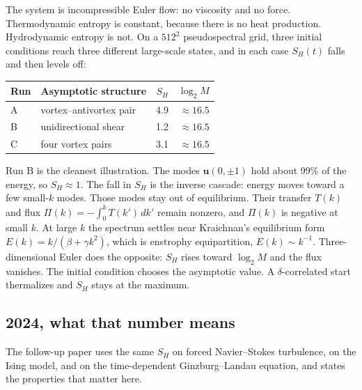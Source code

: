 \documentclass[11pt,a4paper]{article}
\begin{document}
The system is incompressible Euler flow: no viscosity and no force.
Thermodynamic entropy is constant, because there is no heat production.
Hydrodynamic entropy is not.
On a \(512^2\) pseudospectral grid, three initial conditions reach three different large-scale states, and in each case \(S_H(t)\) falls and then levels off:

\begin{center}
\begin{tabular}{llrr}
\toprule
Run & Asymptotic structure & \(S_H\) & \(\log_2 M\) \\
\midrule
A & vortex--antivortex pair & 4.9 & \(\approx 16.5\) \\
B & unidirectional shear & 1.2 & \(\approx 16.5\) \\
C & four vortex pairs & 3.1 & \(\approx 16.5\) \\
\bottomrule
\end{tabular}
\end{center}

Run B is the cleanest illustration. The modes \(\mathbf{u}(0,\pm 1)\) hold about 99\% of the energy, so \(S_H \approx 1\).
The fall in \(S_H\) is the inverse cascade: energy moves toward a few small-\(k\) modes.
Those modes stay out of equilibrium. Their transfer \(T(k)\) and flux
\(\Pi(k) = -\int_0^k T(k')\,dk'\) remain nonzero, and \(\Pi(k)\) is negative at small \(k\).
At large \(k\) the spectrum settles near Kraichnan's equilibrium form
\(E(k) = k/(\beta + \gamma k^2)\), which is enstrophy equipartition, \(E(k)\sim k^{-1}\).
Three-dimensional Euler does the opposite: \(S_H\) rises toward \(\log_2 M\) and the flux vanishes.
The initial condition chooses the asymptotic value. A \(\delta\)-correlated start thermalizes and \(S_H\) stays at the maximum.

\subsection{2024, what that number means}

The follow-up paper uses the same \(S_H\) on forced Navier--Stokes turbulence, on the Ising model, and on the time-dependent Ginzburg--Landau equation, and states the properties that matter here.
\end{document}
